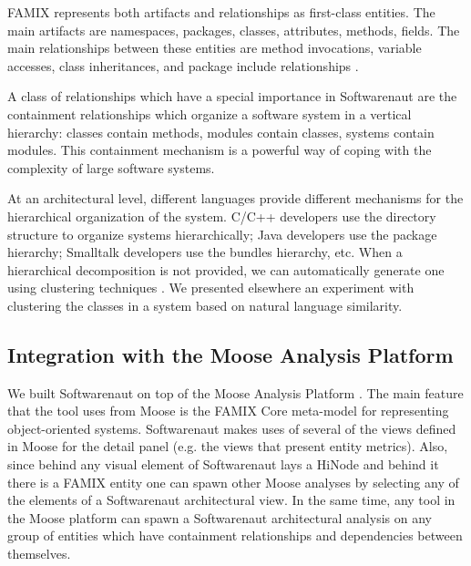 \documentclass[preprint,12pt]{elsarticle}
\begin{document}
FAMIX represents both artifacts and relationships as first-class entities. The main artifacts are namespaces, packages, classes, attributes, methods, fields. The main relationships between these entities are method invocations, variable accesses, class inheritances, and package include relationships \cite{tichelaar-thesis}.

A class of relationships which have a special importance in Softwarenaut are the containment relationships which organize a software system in a vertical hierarchy: classes contain methods, modules contain classes, systems contain modules. This containment mechanism is a powerful way of coping with the complexity of large software systems.

At an architectural level, different languages provide different mechanisms for the hierarchical organization of the system. C/C++ developers use the directory structure to organize systems hierarchically; Java developers use the package hierarchy; Smalltalk developers use the bundles hierarchy, etc. 
When a hierarchical decomposition is not provided, we can automatically generate one using clustering techniques \cite{koschke-thesis}. We presented elsewhere an experiment with clustering the classes in a system based on natural language similarity\cite{Lung05a}.



\subsection {Integration with the Moose Analysis Platform}
We built Softwarenaut on top of the Moose Analysis Platform \cite{nier-story}. The main feature that the tool uses from Moose is the FAMIX Core meta-model for representing object-oriented systems. 
Softwarenaut makes uses of several of the views defined in Moose for the detail panel (e.g. the views that present entity metrics). Also, since behind any visual element of Softwarenaut lays a HiNode and behind it there is a FAMIX entity one can spawn other Moose analyses by selecting any of the elements of a Softwarenaut architectural view. In the same time, any tool in the Moose platform can spawn a Softwarenaut architectural analysis on any group of entities which have containment relationships and dependencies between themselves.
\end{document}
